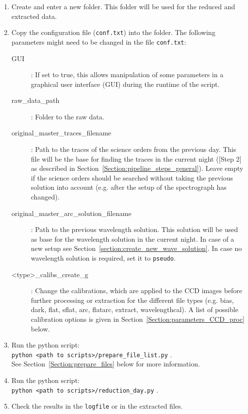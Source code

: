 \documentclass[10pt,a4paper]{article}
\begin{document}
\begin{enumerate}
  \item Create and enter a new folder. This folder will be used for the reduced and extracted data.
  \item Copy the configuration file (\verb|conf.txt|) into the folder. The following parameters might need to be changed in the file \verb|conf.txt|:
  \begin{description}
    \item[GUI] : If set to true, this allows manipulation of some parameters in a graphical user interface (GUI) during the runtime of the script.
    \item[raw\_data\_path] : Folder to the raw data.
    \item[original\_master\_traces\_filename] : Path to the traces of the science orders from the previous day. This file will be the base for finding the traces in the current night ([Step 2] as described in Section~\ref{Section:pipeline_steps_general}). Leave empty if the science orders should be searched without taking the previous solution into account (e.g. after the setup of the spectrograph has changed).
    \item[original\_master\_arc\_solution\_filename] : Path to the previous wavelength solution. This solution will be used as base for the wavelength solution in the current night. In case of a new setup see Section~\ref{section:create_new_wave_solution}. In case no wavelength solution is required, set it to \verb|pseudo|.
    \item[\textless type\textgreater\_calibs\_create\_g] : Change the calibrations, which are applied to the CCD images before further processing or extraction for the different file types (e.g. bias, dark, flat, sflat, arc, flatarc, extract, wavelengthcal). A list of possible calibration options is given in Section~\ref{Section:parameters_CCD_proc} below.
  \end{description}
  \item Run the python script: \\ \verb|python <path to scripts>/prepare_file_list.py| . \\ See Section~\ref{Section:prepare_files} below for more information.
  \item Run the python script: \\ \verb|python <path to scripts>/reduction_day.py| .
  \item Check the results in the \verb|logfile| or in the extracted files.
\end{enumerate}
\end{document}
